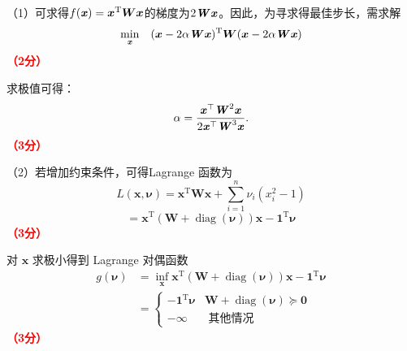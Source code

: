 \documentclass[12pt,a4paper,openany,twoside]{ctexbook}
\begin{document}
\begin{Solution}
	（1）可求得$f(\boldsymbol{\mathit{x}}) = \boldsymbol{x}^{\mathrm{T}} \boldsymbol{W} \boldsymbol{x}$的梯度为$2\boldsymbol{\mathit{W}} \boldsymbol{\mathit{x}}$。因此，为寻求得最佳步长，需求解
	$$
	\min_{\boldsymbol{\mathit{x}}} \quad (\boldsymbol{x} - 2 \alpha \boldsymbol{\mathit{W}} \boldsymbol{\mathit{x}})^{\mathrm{T}} \boldsymbol{W} (\boldsymbol{x} - 2 \alpha \boldsymbol{\mathit{W}} \boldsymbol{\mathit{x}})
	$$
	\hfill \textcolor{red}{\textbf{（2分）}}
	
	求极值可得：
	$$\alpha = \frac{\boldsymbol{\mathit{x}}^\top \boldsymbol{\mathit{W}}^2 \boldsymbol{\mathit{x}}}{2\boldsymbol{\mathit{x}}^\top \boldsymbol{\mathit{W}}^3 \boldsymbol{\mathit{x}}}.$$
	\hfill \textcolor{red}{\textbf{（3分）}}
	
	（2）若增加约束条件，可得Lagrange 函数为
	$$
	L(\boldsymbol{x}, \boldsymbol{\nu})=\boldsymbol{x}^{\mathrm{T}} \boldsymbol{W} \boldsymbol{x}+\sum_{i=1}^n \nu_i\left(x_i^2-1\right)
	$$
	$$
	=\boldsymbol{x}^{\mathrm{T}}(\boldsymbol{W}+\operatorname{diag}(\boldsymbol{\nu})) \boldsymbol{x}-\mathbf{1}^{\mathrm{T}} \boldsymbol{\nu}
	$$\hfill \textcolor{red}{\textbf{（3分）}}
	
	对 $\boldsymbol{x}$ 求极小得到 Lagrange 对偶函数
	$$
	\begin{aligned}
		g(\boldsymbol{\nu}) &=\inf _{\boldsymbol{x}} \boldsymbol{x}^{\mathrm{T}}(\boldsymbol{W}+\operatorname{diag}(\boldsymbol{\nu})) \boldsymbol{x}-\mathbf{1}^{\mathrm{T}} \boldsymbol{\nu} \\
		&= \begin{cases}-\mathbf{1}^{\mathrm{T}} \boldsymbol{\nu} & \boldsymbol{W}+\operatorname{diag}(\boldsymbol{\nu}) \succeq \mathbf{0} \\
			-\infty & \text { 其他情况 }\end{cases}
	\end{aligned}
	$$\hfill \textcolor{red}{\textbf{（3分）}}
\end{Solution}
\end{document}
